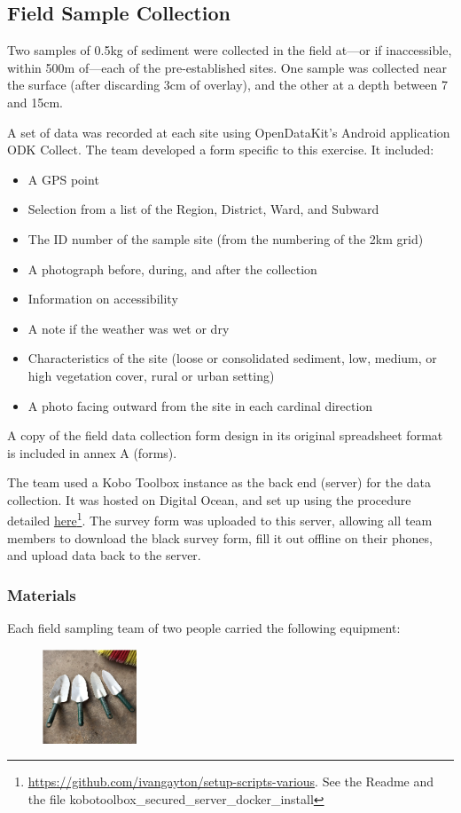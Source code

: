 \documentclass[a4paper,12pt,twoside]{article}
\begin{document}
\subsection{Field Sample Collection}
\label{fieldsamplecollection}
\color{RHgrey}
Two samples of 0.5kg of sediment were collected in the field at---or if inaccessible, within 500m of---each of the pre-established sites. One sample was collected near the surface (after discarding 3cm of overlay), and the other at a depth between 7 and 15cm.

A set of data was recorded at each site using OpenDataKit's Android application ODK Collect. The team developed a form specific to this exercise. It included:
\begin{itemize}
  \item A GPS point
  \item Selection from a list of the Region, District, Ward, and Subward
  \item The ID number of the sample site (from the numbering of the 2km grid)
  \item A photograph before, during, and after the collection
  \item Information on accessibility
  \item A note if the weather was wet or dry
  \item Characteristics of the site (loose or consolidated sediment, low, medium, or high vegetation cover, rural or urban setting)
  \item A photo facing outward from the site in each cardinal direction
\end{itemize}

A copy of the field data collection form design in its original spreadsheet format is included in annex A (forms).

The team used a Kobo Toolbox instance as the back end (server) for the data collection. It was hosted on Digital Ocean, and set up using the procedure detailed \href{https://github.com/ivangayton/setup-scripts-various}{here}\footnote{\url{https://github.com/ivangayton/setup-scripts-various}\color{RHgrey}. See the Readme and the file kobotoolbox\_secured\_server\_docker\_install}. The survey form was uploaded to this server, allowing all team members to download the black survey form, fill it out offline on their phones, and upload data back to the server. 

\newpage
\color{RHblue}
\subsubsection{Materials}
\color{RHgrey}
Each field sampling team of two people carried the following equipment:
\begin{figure}
  \centering
  \includegraphics[width=0.25\textwidth]{trowels.png}
\end{figure}
\end{document}

